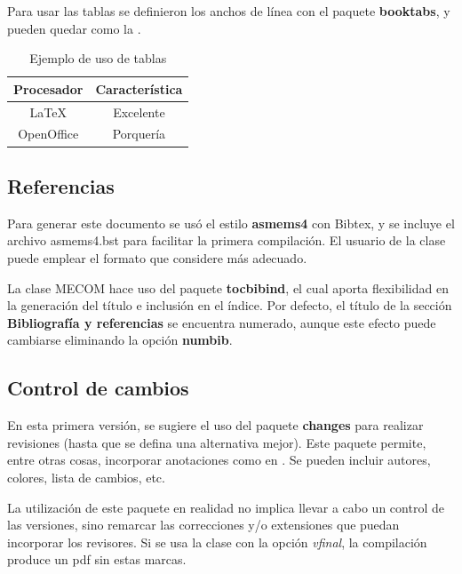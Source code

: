 \documentclass[a4paper,11pt,twoside]{MECOM}
\begin{document}
    
    \par
    Para usar las tablas se definieron los anchos de l\'inea con el paquete {\bf booktabs}, y pueden quedar como la .
    \begin{table}[ht]
        \centering
        \begin{tabular}{c c}
            \toprule
            \bf Procesador & \bf Caracter\'istica \\
            \midrule
            \LaTeX{} & Excelente \\
            OpenOffice & Porquer\'ia\\
            \bottomrule
        \end{tabular}
        \caption{Ejemplo de uso de tablas}
        \label{tab:prueba}
    \end{table}    
    


    
    \subsection{Referencias}
    Para generar este documento se us\'o el estilo {\bf asmems4} con Bibtex, y se incluye el archivo asmems4.bst para facilitar la primera compilaci\'on. El usuario de la clase puede emplear el formato que considere m\'as adecuado.
    \par
    La clase MECOM hace uso del paquete {\bf tocbibind}, el cual aporta flexibilidad en la generaci\'on del t\'itulo e inclusi\'on en el \'indice. Por defecto, el t\'itulo de la secci\'on {\bf Bibliograf\'ia y referencias} se encuentra numerado, aunque este efecto puede cambiarse eliminando la opci\'on {\bf numbib}.
    
    
    
    \subsection{Control de cambios}
    En esta primera versi\'on, se sugiere el uso del paquete {\bf changes} para realizar revisiones (hasta que se defina una alternativa mejor). Este paquete permite, entre otras cosas, incorporar anotaciones como en . Se pueden incluir autores, colores, lista de cambios, etc.
    \par
    La utilizaci\'on de este paquete en realidad no implica llevar a cabo un control de las versiones, sino remarcar las correcciones y/o extensiones que puedan incorporar los revisores. Si se usa la clase con la opci\'on \emph{vfinal}, la compilaci\'on produce un pdf sin estas marcas.
    
\end{document}
